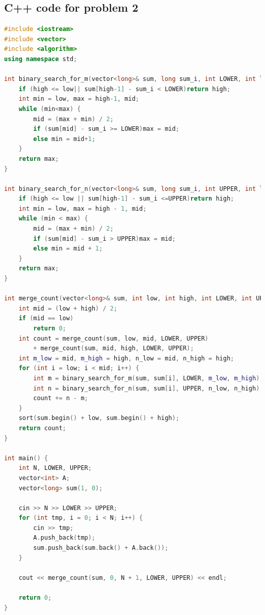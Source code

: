 \documentclass[12pt,a4paper]{article}
\theoremstyle{definition}
\begin{document}
\subsection{C++ code for problem 2}
\begin{lstlisting}[language=C++,numberstyle=\tiny, 
        basicstyle=\small]
#include <iostream>
#include <vector>
#include <algorithm>
using namespace std;

int binary_search_for_m(vector<long>& sum, long sum_i, int LOWER, int low, int high) {
	if (high <= low|| sum[high-1] - sum_i < LOWER)return high;
	int min = low, max = high-1, mid;
	while (min<max) {
		mid = (max + min) / 2;
		if (sum[mid] - sum_i >= LOWER)max = mid;
		else min = mid+1;
	}
	return max;
}

int binary_search_for_n(vector<long>& sum, long sum_i, int UPPER, int low, int high) {
	if (high <= low || sum[high-1] - sum_i <=UPPER)return high;
	int min = low, max = high - 1, mid;
	while (min < max) {
		mid = (max + min) / 2;
		if (sum[mid] - sum_i > UPPER)max = mid;
		else min = mid + 1;
	}
	return max;
}

int merge_count(vector<long>& sum, int low, int high, int LOWER, int UPPER) {
	int mid = (low + high) / 2;
	if (mid == low)
		return 0;
	int count = merge_count(sum, low, mid, LOWER, UPPER)
		+ merge_count(sum, mid, high, LOWER, UPPER);
	int m_low = mid, m_high = high, n_low = mid, n_high = high;
	for (int i = low; i < mid; i++) {
		int m = binary_search_for_m(sum, sum[i], LOWER, m_low, m_high);
		int n = binary_search_for_n(sum, sum[i], UPPER, n_low, n_high);
		count += n - m;
	}
	sort(sum.begin() + low, sum.begin() + high);
	return count;
}

int main() {
	int N, LOWER, UPPER;
	vector<int> A;
	vector<long> sum(1, 0);

	cin >> N >> LOWER >> UPPER;
	for (int tmp, i = 0; i < N; i++) {
		cin >> tmp;
		A.push_back(tmp);
		sum.push_back(sum.back() + A.back());
	}

	cout << merge_count(sum, 0, N + 1, LOWER, UPPER) << endl;

	return 0;
}
\end{lstlisting}
\end{document}
